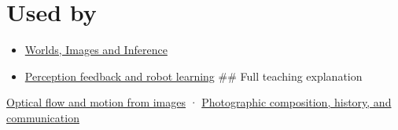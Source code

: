 \section{Used by}\label{appendix-e2e73f8cd93e-used-by}

\begin{itemize}
\item
  \href{Continuous\%20Notes/University\%20-\%20Worlds,\%20Images\%20and\%20Inference\%20-\%20Graphics,\%20Vision\%20and\%20Photography}{Worlds, Images and Inference}
\item
  \hyperref[appendix-b0c42da325f1]{Perception feedback and robot learning} \#\# Full teaching explanation
\end{itemize}

\href{Continuous\%20Notes/University\%20-\%20Worlds,\%20Images\%20and\%20Inference\%20-\%20Graphics,\%20Vision\%20and\%20Photography\#Optical\%20flow\%20and\%20motion\%20from\%20images}{Optical flow and motion from images} · \href{Continuous\%20Notes/University\%20-\%20Worlds,\%20Images\%20and\%20Inference\%20-\%20Graphics,\%20Vision\%20and\%20Photography\#Photographic\%20composition,\%20history,\%20and\%20communication}{Photographic composition, history, and communication}
